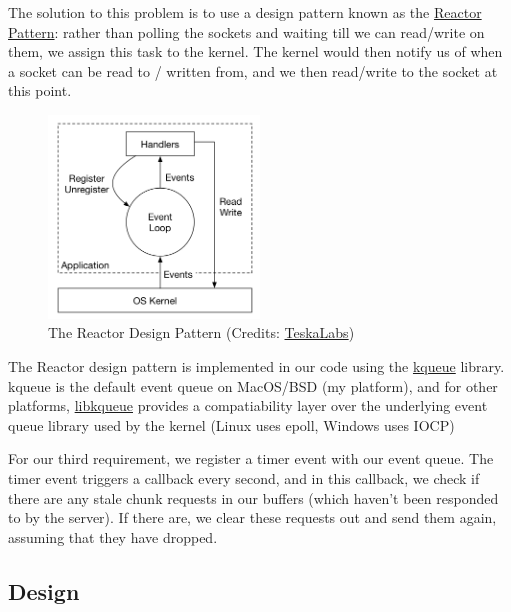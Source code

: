 \documentclass[12pt]{article}
\begin{document}
The solution to this problem is to use a design pattern known as the \href{https://dzone.com/articles/understanding-reactor-pattern-thread-based-and-eve}{Reactor Pattern}: rather than polling the sockets and waiting till we can read/write on them, we assign this task to the kernel. The kernel would then notify us of when a socket can be read to / written from, and we then read/write to the socket at this point. 

\begin{figure}[H]
  \centering
  \includegraphics[width=0.5\textwidth]{reactor_pattern.png}
  \caption{The Reactor Design Pattern (Credits: \href{https://teskalabs.com/blog/building-high-performance-application-servers}{TeskaLabs})}
\end{figure}

The Reactor design pattern is implemented in our code using the \href{https://www.freebsd.org/cgi/man.cgi?query=kevent&apropos=0&sektion=0&manpath=FreeBSD+9.0-RELEASE&arch=default&format=html}{kqueue} library. kqueue is the default event queue on MacOS/BSD (my platform), and for other platforms, \href{https://github.com/mheily/libkqueue}{libkqueue} provides a compatiability layer over the underlying event queue library used by the kernel (Linux uses epoll, Windows uses IOCP)

For our third requirement, we register a timer event with our event queue. The timer event triggers a callback every second, and in this callback, we check if there are any stale chunk requests in our buffers (which haven't been responded to by the server). If there are, we clear these requests out and send them again, assuming that they have dropped.

\subsection{Design}
\end{document}
